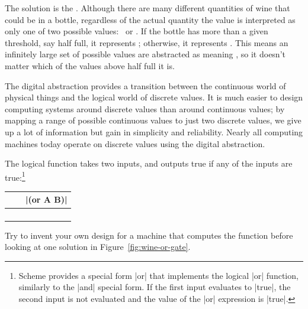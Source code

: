 \begin{schemeregion}
The solution is the .  Although there are many different quantities of wine that could be in a bottle, regardless of the actual quantity the value is interpreted as only one of two possible values: \true\ or \false.  If the bottle has more than a given threshold, say half full, it represents \true; otherwise, it represents \false.  This means an infinitely large set of possible values are abstracted as meaning \true, so it doesn't matter which of the values above half full it is.  


The digital abstraction provides a transition between the continuous world of physical things and the logical world of discrete values.  It is much easier to design computing systems around discrete values than around continuous values; by mapping a range of possible continuous values to just two discrete values, we give up a lot of information but gain in simplicity and reliability.  Nearly all computing machines today operate on discrete values using the digital abstraction.  

 The logical  function takes two inputs, and outputs true if any of the inputs are true:\footnote{Scheme provides a special form \scheme|or| that implements the logical \scheme|or| function, similarly to the \scheme|and| special form.  If the first input evaluates to \schemeresult|true|, the second input is not evaluated and the value of the \scheme|or| expression is \schemeresult|true|.} 
\begin{center}
	\begin{tabular}{cc|c} 
		\var{A} & \var{B} & \scheme|(or A B)| \\ \hline
		\false & \false & \false \\
		\true & \false & \true \\
		\false & \true & \true \\
		\true & \true & \true \\ 
	\end{tabular}
\end{center}
Try to invent your own design for a machine that computes the  function before looking at one solution in Figure~\ref{fig:wine-or-gate}.


\end{schemeregion}
